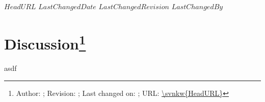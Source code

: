 \svnidlong
{$HeadURL$}
{$LastChangedDate$}
{$LastChangedRevision$}
{$LastChangedBy$}

\section{Discussion\footnote{Author: \svnauthor; Revision: \svnrev; Last changed on: \svndate; URL: \url{\svnkw{HeadURL}}}}

asdf
